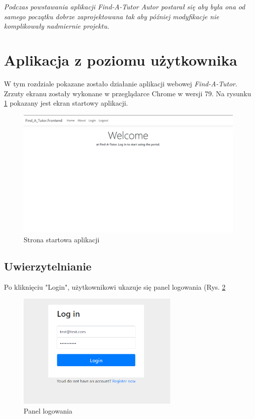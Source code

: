 \documentclass[12pt]{article}
\numberwithin{figure}{section}
\begin{document}
\begin{sloppypar}
\textit{Podczas powstawania aplikacji Find-A-Tutor Autor postarał się aby była ona od samego początku dobrze zaprojektowana tak aby później modyfikacje nie komplikowały nadmiernie projektu. }

\newpage
\section{Aplikacja z poziomu użytkownika}
W tym rozdziale pokazane zostało działanie aplikacji webowej \textit{Find-A-Tutor}. Zrzuty ekranu zostały wykonane w przeglądarce Chrome w wersji 79. Na rysunku \ref{fig:home} pokazany jest ekran startowy aplikacji.

\begin{figure}[!htbp] 
    \centering
    \includegraphics[width=1\textwidth]{images/chapter_4/home.png}
    \caption{Strona startowa aplikacji}
    \label{fig:home}
\end{figure}

\subsection{Uwierzytelnianie}
Po kliknięciu "Login", użytkownikowi ukazuje się panel logowania (Rys. \ref{fig:login}
\begin{figure}[!htbp] 
    \centering
    \includegraphics[width=0.7\textwidth]{images/chapter_4/login.png}
    \caption{Panel logowania}
    \label{fig:login}
\end{figure}


\end{sloppypar}
\end{document}
